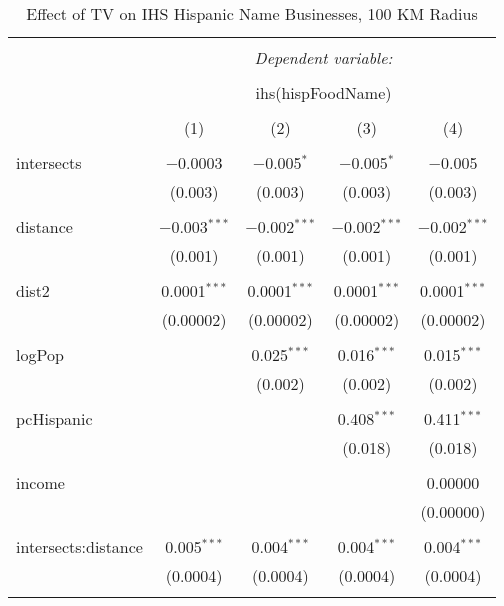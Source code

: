 
\begin{table}[!htbp] \centering 
  \caption{Effect of TV on IHS Hispanic Name Businesses, 100 KM Radius} 
  \label{} 
\begin{tabular}{@{\extracolsep{-5pt}}lcccc} 
\\[-1.8ex]\hline 
\hline \\[-1.8ex] 
 & \multicolumn{4}{c}{\textit{Dependent variable:}} \\ 
\cline{2-5} 
\\[-1.8ex] & \multicolumn{4}{c}{ihs(hispFoodName)} \\ 
\\[-1.8ex] & (1) & (2) & (3) & (4)\\ 
\hline \\[-1.8ex] 
 intersects & $-$0.0003 & $-$0.005$^{*}$ & $-$0.005$^{*}$ & $-$0.005 \\ 
  & (0.003) & (0.003) & (0.003) & (0.003) \\ 
  & & & & \\ 
 distance & $-$0.003$^{***}$ & $-$0.002$^{***}$ & $-$0.002$^{***}$ & $-$0.002$^{***}$ \\ 
  & (0.001) & (0.001) & (0.001) & (0.001) \\ 
  & & & & \\ 
 dist2 & 0.0001$^{***}$ & 0.0001$^{***}$ & 0.0001$^{***}$ & 0.0001$^{***}$ \\ 
  & (0.00002) & (0.00002) & (0.00002) & (0.00002) \\ 
  & & & & \\ 
 logPop &  & 0.025$^{***}$ & 0.016$^{***}$ & 0.015$^{***}$ \\ 
  &  & (0.002) & (0.002) & (0.002) \\ 
  & & & & \\ 
 pcHispanic &  &  & 0.408$^{***}$ & 0.411$^{***}$ \\ 
  &  &  & (0.018) & (0.018) \\ 
  & & & & \\ 
 income &  &  &  & 0.00000 \\ 
  &  &  &  & (0.00000) \\ 
  & & & & \\ 
 intersects:distance & 0.005$^{***}$ & 0.004$^{***}$ & 0.004$^{***}$ & 0.004$^{***}$ \\ 
  & (0.0004) & (0.0004) & (0.0004) & (0.0004) \\ 
  & & & & \\ 

\end{tabular}
\end{table}
